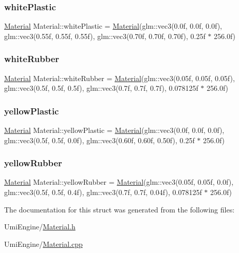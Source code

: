 \subsubsection{\texorpdfstring{whitePlastic}{whitePlastic}}
{\footnotesize\ttfamily \mbox{\hyperlink{struct_material}{Material}} Material\+::white\+Plastic = \mbox{\hyperlink{struct_material}{Material}}(glm\+::vec3(0.\+0f, 0.\+0f, 0.\+0f), glm\+::vec3(0.\+55f, 0.\+55f, 0.\+55f), glm\+::vec3(0.\+70f, 0.\+70f, 0.\+70f), 0.\+25f $\ast$ 256.\+0f)\hspace{0.3cm}{\ttfamily [static]}}

\mbox{\label{struct_material_ab84b745e205896377d3f1fc0e3d1246f}} 
\subsubsection{\texorpdfstring{whiteRubber}{whiteRubber}}
{\footnotesize\ttfamily \mbox{\hyperlink{struct_material}{Material}} Material\+::white\+Rubber = \mbox{\hyperlink{struct_material}{Material}}(glm\+::vec3(0.\+05f, 0.\+05f, 0.\+05f), glm\+::vec3(0.\+5f, 0.\+5f, 0.\+5f), glm\+::vec3(0.\+7f, 0.\+7f, 0.\+7f), 0.\+078125f $\ast$ 256.\+0f)\hspace{0.3cm}{\ttfamily [static]}}

\mbox{\label{struct_material_a9312d192d0bee2cbcf1e2d1d6f2d9a9e}} 
\subsubsection{\texorpdfstring{yellowPlastic}{yellowPlastic}}
{\footnotesize\ttfamily \mbox{\hyperlink{struct_material}{Material}} Material\+::yellow\+Plastic = \mbox{\hyperlink{struct_material}{Material}}(glm\+::vec3(0.\+0f, 0.\+0f, 0.\+0f), glm\+::vec3(0.\+5f, 0.\+5f, 0.\+0f), glm\+::vec3(0.\+60f, 0.\+60f, 0.\+50f), 0.\+25f $\ast$ 256.\+0f)\hspace{0.3cm}{\ttfamily [static]}}

\mbox{\label{struct_material_acc88ba21b8ed41d61c93d7128b7476fc}} 
\subsubsection{\texorpdfstring{yellowRubber}{yellowRubber}}
{\footnotesize\ttfamily \mbox{\hyperlink{struct_material}{Material}} Material\+::yellow\+Rubber = \mbox{\hyperlink{struct_material}{Material}}(glm\+::vec3(0.\+05f, 0.\+05f, 0.\+0f), glm\+::vec3(0.\+5f, 0.\+5f, 0.\+4f), glm\+::vec3(0.\+7f, 0.\+7f, 0.\+04f), 0.\+078125f $\ast$ 256.\+0f)\hspace{0.3cm}{\ttfamily [static]}}



The documentation for this struct was generated from the following files\+:\begin{DoxyCompactItemize}
\item 
Umi\+Engine/\mbox{\hyperlink{_material_8h}{Material.\+h}}\item 
Umi\+Engine/\mbox{\hyperlink{_material_8cpp}{Material.\+cpp}}\end{DoxyCompactItemize}

